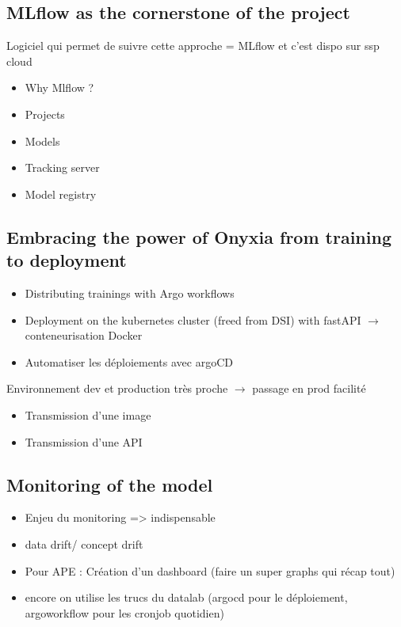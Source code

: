 \subsection{MLflow as the cornerstone of the project}

Logiciel qui permet de suivre cette approche = MLflow et c'est dispo sur ssp cloud

\begin{itemize}
    \item Why Mlflow ?
    \item Projects
    \item Models
    \item Tracking server
    \item Model registry
\end{itemize}

\subsection{Embracing the power of Onyxia from training to deployment}

\begin{itemize}
    \item Distributing trainings with Argo workflows
    \item Deployment on the kubernetes cluster (freed from DSI) with fastAPI  $\rightarrow$ conteneurisation Docker
    \item Automatiser les déploiements avec argoCD
\end{itemize}

Environnement dev et production très proche $\rightarrow$ passage en prod facilité
\begin{itemize}
    \item Transmission d'une image
    \item Transmission d'une API
\end{itemize}

\subsection{Monitoring of the model}

\begin{itemize}
    \item Enjeu du monitoring => indispensable
    \item data drift/ concept drift
    \item Pour APE : Création d'un dashboard (faire un super graphs qui récap tout)
    \item encore on utilise les trucs du datalab (argocd pour le déploiement, argoworkflow pour les cronjob quotidien)
\end{itemize}

